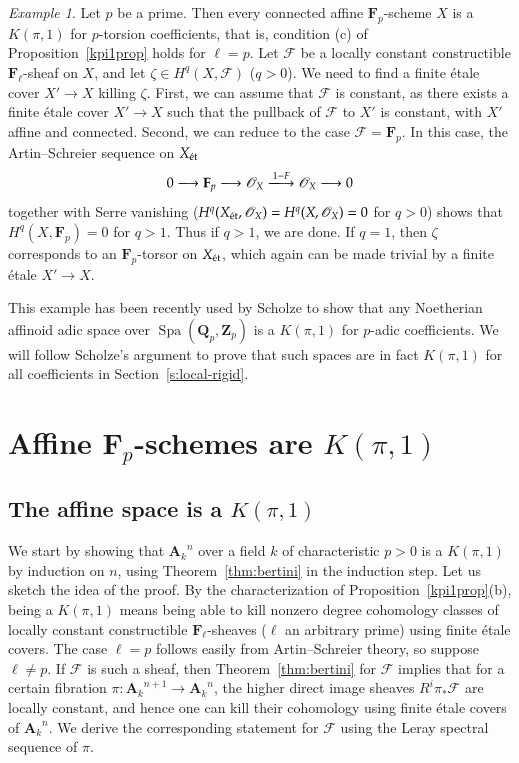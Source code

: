 \documentclass[twoside]{amsart}
\renewcommand{\AA}{\mathbf{A}}
\newcommand{\FF}{\mathbf{F}}
\newcommand{\QQ}{\mathbf{Q}}
\newcommand{\ZZ}{\mathbf{Z}}
\newcommand{\Ff}{\mathscr{F}}
\newcommand{\Oo}{\mathscr{O}}
\newcommand{\et}{{\rm\acute{e}t}}
\DeclareMathOperator{\Spa}{Spa}
\newcommand{\ANK}[2]{{\AA_{#2}}^{\! \! \! \!  #1}} %
\newcommand{\AN}[1]{\ANK{#1}{k}}
\renewcommand{\to}{\longrightarrow}
\theoremstyle{plain}
\theoremstyle{definition}
\theoremstyle{remark}
\newtheorem{example}[subsubsection]{Example}
\numberwithin{equation}{subsection}
\begin{document}
\begin{example} \label{ex:padickpi1}
Let $p$ be a prime. Then every connected affine $\FF_p$-scheme $X$ is a $K(\pi, 1)$ for $p$-torsion coefficients, that is, condition (c) of Proposition~\ref{kpi1prop} holds for $\ell=p$. Let $\Ff$ be a locally constant constructible $\FF_\ell$-sheaf on $X$, and let $\zeta\in H^q(X, \Ff)$ ($q>0$). We need to find a finite \'etale cover $X'\to X$ killing $\zeta$. First, we can assume that $\Ff$ is constant, as there exists a finite \'etale cover $X'\to X$ such that the pullback of $\Ff$ to $X'$ is constant, with $X'$ affine and connected. Second, we can reduce to the case $\Ff = \FF_p$. In this case, the Artin--Schreier sequence on $X_\et$
\[  0\to \FF_p \to \Oo_X \xlongrightarrow{1-F} \Oo_X \to 0 \]
together with Serre vanishing ($H^q(X_\et, \Oo_X) = H^q(X, \Oo_X) = 0$ for $q>0$) shows that $H^q(X, \FF_p) = 0$ for $q>1$. Thus if $q>1$, we are done. If $q=1$, then $\zeta$ corresponds to an $\FF_p$-torsor on $X_\et$, which again can be made trivial by a finite \'etale $X'\to X$. 

This example has been recently used by Scholze \cite[Theorem~4.9]{ScholzePAdic} to show that any Noetherian affinoid adic space over $\Spa(\QQ_p, \ZZ_p)$ is a $K(\pi, 1)$ for $p$-adic coefficients. We will follow Scholze's argument to prove that such spaces are in fact $K(\pi, 1)$ for all coefficients in Section~\ref{s:local-rigid}.
\end{example}

\section{\texorpdfstring{Affine $\FF_p$-schemes are $K(\pi, 1)$}{Affine Fp-schemes are K(pi, 1)}} \label{s:affine-kpi1}

\subsection{The affine space is a $K(\pi, 1)$}
\label{ss:an-kpi1}

We start by showing that $\AN n$ over a field $k$ of characteristic $p>0$ is a $K(\pi, 1)$ by induction on $n$, using Theorem~\ref{thm:bertini} in the induction step. Let us sketch the idea of the proof. By the characterization of Proposition~\ref{kpi1prop}(b), being a $K(\pi, 1)$ means being able to kill nonzero degree cohomology classes of locally constant constructible $\FF_\ell$-sheaves ($\ell$ an arbitrary prime) using finite \'etale covers. The case $\ell=p$ follows easily from Artin--Schreier theory, so suppose $\ell\neq p$. If $\Ff$ is such a sheaf, then Theorem~\ref{thm:bertini} for $\Ff$ implies that for a certain fibration $\pi\colon \AN{n+1} \to \AN{n}$, the higher direct image sheaves $R^i \pi_* \Ff$ are locally constant, and hence one can kill their cohomology using finite \'etale covers of $\AN{n}$. We derive the corresponding statement for $\Ff$ using the Leray spectral sequence of $\pi$.
\end{document}
